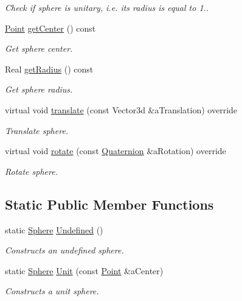 \begin{DoxyCompactItemize}
\begin{DoxyCompactList}\small\item\em Check if sphere is unitary, i.\+e. its radius is equal to 1.. \end{DoxyCompactList}\item 
\hyperlink{classlibrary_1_1math_1_1geom_1_1d3_1_1objects_1_1_point}{Point} \hyperlink{classlibrary_1_1math_1_1geom_1_1d3_1_1objects_1_1_sphere_a871367ab75aa46194a6b8ddc8a45967f}{get\+Center} () const
\begin{DoxyCompactList}\small\item\em Get sphere center. \end{DoxyCompactList}\item 
Real \hyperlink{classlibrary_1_1math_1_1geom_1_1d3_1_1objects_1_1_sphere_a48cfc72b6eec9a953fb837a13e1df45e}{get\+Radius} () const
\begin{DoxyCompactList}\small\item\em Get sphere radius. \end{DoxyCompactList}\item 
virtual void \hyperlink{classlibrary_1_1math_1_1geom_1_1d3_1_1objects_1_1_sphere_af2a22ab0dc9331bddf358a9c24f8e7cf}{translate} (const Vector3d \&a\+Translation) override
\begin{DoxyCompactList}\small\item\em Translate sphere. \end{DoxyCompactList}\item 
virtual void \hyperlink{classlibrary_1_1math_1_1geom_1_1d3_1_1objects_1_1_sphere_a6eb8a0a7e27bf24d3f1101a6700f5247}{rotate} (const \hyperlink{classlibrary_1_1math_1_1geom_1_1trf_1_1rot_1_1_quaternion}{Quaternion} \&a\+Rotation) override
\begin{DoxyCompactList}\small\item\em Rotate sphere. \end{DoxyCompactList}\end{DoxyCompactItemize}
\subsection*{Static Public Member Functions}
\begin{DoxyCompactItemize}
\item 
static \hyperlink{classlibrary_1_1math_1_1geom_1_1d3_1_1objects_1_1_sphere}{Sphere} \hyperlink{classlibrary_1_1math_1_1geom_1_1d3_1_1objects_1_1_sphere_a777600f8814a2879e925909f30cfe9c4}{Undefined} ()
\begin{DoxyCompactList}\small\item\em Constructs an undefined sphere. \end{DoxyCompactList}\item 
static \hyperlink{classlibrary_1_1math_1_1geom_1_1d3_1_1objects_1_1_sphere}{Sphere} \hyperlink{classlibrary_1_1math_1_1geom_1_1d3_1_1objects_1_1_sphere_a5464ea9145425db63dedbd896d6c97b0}{Unit} (const \hyperlink{classlibrary_1_1math_1_1geom_1_1d3_1_1objects_1_1_point}{Point} \&a\+Center)
\begin{DoxyCompactList}\small\item\em Constructs a unit sphere. \end{DoxyCompactList}\end{DoxyCompactItemize}
